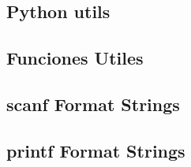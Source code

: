 \subsection{Python utils}

%
\subsection{Funciones Utiles}

\subsection{scanf Format Strings}

\subsection{printf Format Strings}

